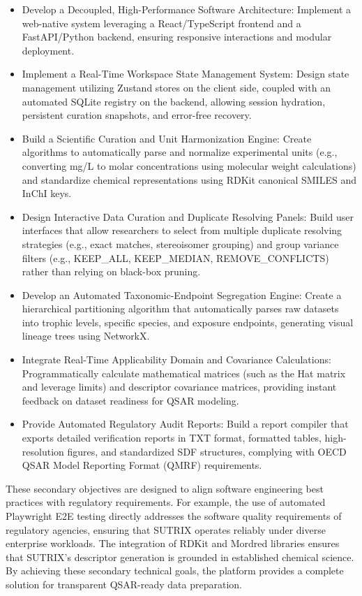 \begin{itemize}
  \item Develop a Decoupled, High-Performance Software Architecture: Implement a web-native system leveraging a React/TypeScript frontend and a FastAPI/Python backend, ensuring responsive interactions and modular deployment.
  \item Implement a Real-Time Workspace State Management System: Design state management utilizing Zustand stores on the client side, coupled with an automated SQLite registry on the backend, allowing session hydration, persistent curation snapshots, and error-free recovery.
  \item Build a Scientific Curation and Unit Harmonization Engine: Create algorithms to automatically parse and normalize experimental units (e.g., converting mg/L to molar concentrations using molecular weight calculations) and standardize chemical representations using RDKit canonical SMILES and InChI keys.
  \item Design Interactive Data Curation and Duplicate Resolving Panels: Build user interfaces that allow researchers to select from multiple duplicate resolving strategies (e.g., exact matches, stereoisomer grouping) and group variance filters (e.g., KEEP\_ALL, KEEP\_MEDIAN, REMOVE\_CONFLICTS) rather than relying on black-box pruning.
  \item Develop an Automated Taxonomic-Endpoint Segregation Engine: Create a hierarchical partitioning algorithm that automatically parses raw datasets into trophic levels, specific species, and exposure endpoints, generating visual lineage trees using NetworkX.
  \item Integrate Real-Time Applicability Domain and Covariance Calculations: Programmatically calculate mathematical matrices (such as the Hat matrix and leverage limits) and descriptor covariance matrices, providing instant feedback on dataset readiness for QSAR modeling.
  \item Provide Automated Regulatory Audit Reports: Build a report compiler that exports detailed verification reports in TXT format, formatted tables, high-resolution figures, and standardized SDF structures, complying with OECD QSAR Model Reporting Format (QMRF) requirements.
\end{itemize}

These secondary objectives are designed to align software engineering best practices with regulatory requirements. For example, the use of automated Playwright E2E testing directly addresses the software quality requirements of regulatory agencies, ensuring that SUTRIX operates reliably under diverse enterprise workloads. The integration of RDKit and Mordred libraries ensures that SUTRIX's descriptor generation is grounded in established chemical science. By achieving these secondary technical goals, the platform provides a complete solution for transparent QSAR-ready data preparation.

